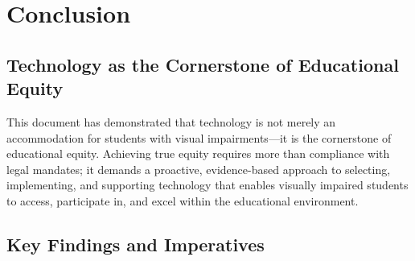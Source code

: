 \chapter{Conclusion}\label{main-conclusion}

\section{Technology as the Cornerstone of Educational Equity}
\label{sec:conclusion-technology-equity}

This document has demonstrated that technology is not merely an accommodation for students with visual impairments—it is the cornerstone of educational equity. Achieving true equity requires more than compliance with legal mandates; it demands a proactive, evidence-based approach to selecting, implementing, and supporting technology that enables visually impaired students to access, participate in, and excel within the educational environment. \supercite{IntroductionChapter1, Burgstahler2015, Kelly2011}

\section{Key Findings and Imperatives}
\label{sec:conclusion-key-findings}

